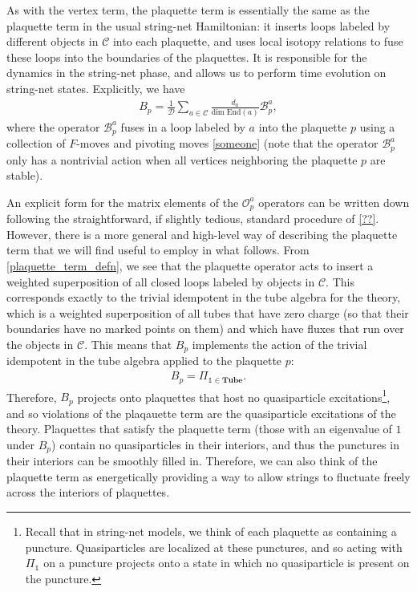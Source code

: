 \documentclass[12pt,a4paper]{article}
\newcommand{\unit}{\mathds{1}}
\newcommand{\mcb}{\mathcal{B}}
\newcommand{\mcd}{\mathcal{D}}
\newcommand{\mcc}{\mathcal{C}}
\newcommand{\mco}{\mathcal{O}}
\newcommand{\p}{\partial}
\newcommand{\tube}{\textbf{Tube}}
\begin{document}
As with the vertex term, the plaquette term is essentially the same as the plaquette term in the usual string-net Hamiltonian: it inserts loops labeled by different objects in $\mcc$ into each plaquette, and uses local isotopy relations to fuse these loops into the boundaries of the plaquettes. 
It is responsible for the dynamics in the string-net phase, and allows us to perform time evolution on string-net states.  
Explicitly, we have
\begin{align} \label{plaquette_term_defn}
B_p =\frac{1}{\mcd} \sum_{a \in \mcc} \frac{d_a}{\text{dim} \; \text{End}(a)} \mcb^a_p, %
\end{align}
where the operator $\mcb_p^a$ fuses in a loop labeled by $a$ into the plaquette $p$ using a collection of $F$-moves and pivoting moves \ref{someone} (note that the operator $\mcb_p^a$ only has a nontrivial action when all vertices neighboring the plaquette $p$ are stable).

An explicit form for the matrix elements of the $\mco_p^a$ operators can be written down following the straightforward, if slightly tedious, standard procedure of \ref{??}.
However, there is a more general and high-level way of describing the plaquette term that we will find useful to employ in what follows. 
From \eqref{plaquette_term_defn}, we see that the plaquette operator acts to insert a 
weighted superposition of all closed loops labeled by objects in $\mcc$.
This corresponds exactly to the trivial idempotent in the tube algebra for the theory, 
which is a weighted superposition of all tubes that have zero charge (so that their boundaries have no marked points on them) and which have fluxes that run over the objects in $\mcc$.
This means that $B_p$ implements the action of the trivial idempotent in the tube algebra applied to the plaquette $p$:
\begin{align}
B_{p} = \Pi_{\unit \in \tube}.
\end{align}
Therefore, $B_p$ projects onto plaquettes that host no quasiparticle excitations\footnote{Recall that in string-net models, we think of each plaquette as containing a puncture. Quasiparticles are localized at these punctures, and so acting with $\Pi_\unit$ on a puncture projects onto a state in which no quasiparticle is present on the puncture.}, 
and so violations of the plaqauette term are the quasiparticle excitations of the theory. 
Plaquettes that satisfy the plaquette term (those with an eigenvalue of $1$ under $B_p$) contain no quasiparticles in their interiors, and thus the punctures in their interiors can be smoothly filled in. 
Therefore, we can also think of the plaquette term as energetically providing a way to allow strings to fluctuate freely across the interiors of plaquettes. 
\end{document}
